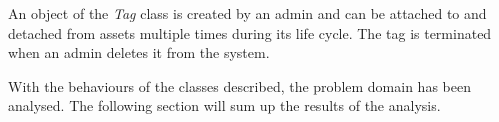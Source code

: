 An object of the \textit{Tag} class is created by an admin and can be attached to and detached from assets multiple times during its life cycle. The tag is terminated when an admin deletes it from the system.
\par

With the behaviours of the classes described, the problem domain has been analysed. The following section will sum up the results of the analysis.


